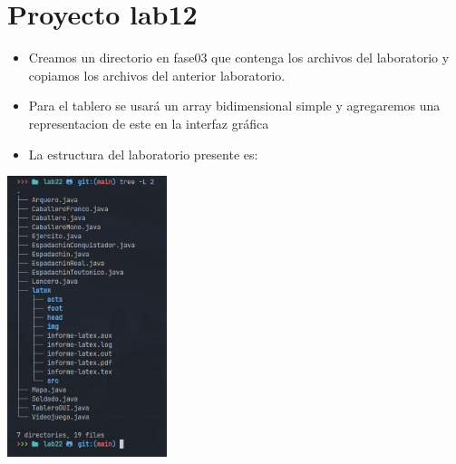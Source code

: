 \newpage %
\section{Proyecto lab12}
\begin{itemize}
  \item Creamos un directorio en fase03 que contenga los archivos del laboratorio y copiamos los archivos del anterior laboratorio.
  \item Para el tablero se usará un array bidimensional simple y agregaremos una representacion de este en la interfaz gráfica
  \item La estructura del laboratorio presente es:
\end{itemize}
\includegraphics[width=0.35\textwidth]{img/tree.jpg}
